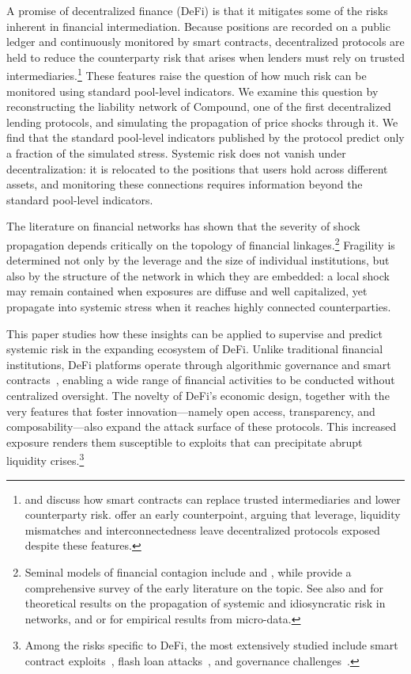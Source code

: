\documentclass[a4paper,UKenglish,cleveref, autoref, thm-restate]{informs3}
\newcommand{\rev}[1]{{\color{purple}#1}}
\DeclareRobustCommand{\latestrev}[1]{{\color{red}\hypersetup{linkcolor=red,citecolor=red,urlcolor=red}#1}}
\begin{document}
\rev{A promise of decentralized finance (DeFi) is that it mitigates
some of the risks inherent in financial intermediation. Because positions are
recorded on a public ledger and continuously monitored by smart contracts,
decentralized protocols are held to reduce the counterparty risk
that arises when lenders must rely on trusted
intermediaries.\footnote{\cite{schar2022defi} and \cite{harvey2021defi}
discuss how smart contracts can replace trusted intermediaries and
lower counterparty risk. \cite{aramonte2021defi} offer an early
counterpoint, arguing that leverage, liquidity mismatches and
interconnectedness leave decentralized protocols exposed despite these
features.} \latestrev{These features raise the question of how much risk can be monitored using standard pool-level indicators. We examine this question} by reconstructing the liability network of Compound, one of the
first decentralized lending protocols, and simulating the propagation of price shocks through it. We find that the \latestrev{standard pool-level} indicators published by the protocol predict only a fraction of the \latestrev{simulated} stress. Systemic risk does not vanish under
decentralization: it is relocated to the positions that users hold
across different assets, and \latestrev{monitoring these connections requires information beyond the standard pool-level indicators}.}

\rev{The literature on financial networks has shown that the severity of shock propagation depends critically on the topology of financial linkages.}\footnote{Seminal models of financial contagion include \cite{allen2000financial} and \cite{elliott2014financial}, while \cite{glasserman2016contagion} provide a comprehensive survey of the early literature on the topic. See also \cite{acemoglu2015systemic} and \cite{gabaix2011granular} for theoretical results on the propagation of systemic and idiosyncratic risk in networks, and \cite{digiovanni2014firms} or \cite{carvalho2021supply} for empirical results from micro-data.} \rev{Fragility is determined not only by the leverage and the size of individual institutions, but also by the structure of the network in which they are embedded: a local shock may remain contained when exposures are diffuse and well capitalized, yet propagate into systemic stress when it reaches highly connected counterparties.}

This paper studies how these insights can be applied to supervise and predict systemic risk in the expanding ecosystem of \rev{DeFi}. Unlike traditional financial institutions, DeFi platforms operate through algorithmic governance and smart contracts~\citep{capponi2023defi}, enabling a wide range of financial activities to be conducted without centralized oversight. The novelty of DeFi’s economic design, together with the very features that foster innovation—namely open access, transparency, and composability—also expand the attack surface of these protocols. This increased exposure renders them susceptible to exploits that can precipitate abrupt liquidity crises.\footnote{Among the risks specific to DeFi, the most extensively studied include smart contract exploits~\citep{Sun2021}, flash loan attacks~\citep{gudgeon2020deficrisis}, and governance challenges~\citep{Dotan2023a}.}
\end{document}
